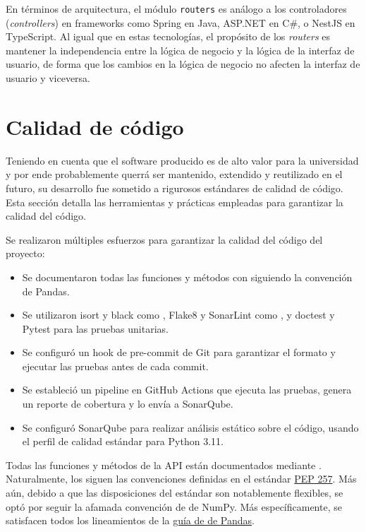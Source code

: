 En términos de arquitectura, el módulo \texttt{routers} es análogo a los controladores (\textit{controllers}) en frameworks como Spring en Java, ASP.NET en C\#, o NestJS en TypeScript. Al igual que en estas tecnologías, el propósito de los \textit{routers} es mantener la independencia entre la lógica de negocio y la lógica de la interfaz de usuario, de forma que los cambios en la lógica de negocio no afecten la interfaz de usuario y viceversa.

\section{Calidad de código}
\label{sec:calidad_codigo}

Teniendo en cuenta que el software producido es de alto valor para la universidad y por ende probablemente querrá ser mantenido, extendido y reutilizado en el futuro, su desarrollo fue sometido a rigurosos estándares de calidad de código. Esta sección detalla las herramientas y prácticas empleadas para garantizar la calidad del código.

\begin{resumen}
	Se realizaron múltiples esfuerzos para garantizar la calidad del código del proyecto:
	\begin{itemize}
		\item Se documentaron todas las funciones y métodos con  siguiendo la convención de \gls{Pandas}.
		\item Se utilizaron \gls{isort} y \gls{black} como , \gls{Flake8} y \gls{SonarLint} como , y \gls{doctest} y \gls{Pytest} para las \gls{pruebas unitarias}.
		\item Se configuró un \gls{hook} de pre-commit de \gls{Git} para garantizar el formato y ejecutar las pruebas antes de cada commit.
		\item Se estableció un \gls{pipeline} en \gls{GitHub Actions} que ejecuta las pruebas, genera un reporte de cobertura y lo envía a \gls{SonarQube}.
		\item Se configuró \gls{SonarQube} para realizar análisis estático sobre el código, usando el \gls{perfil de calidad} estándar para \gls{Python} 3.11.
	\end{itemize}
\end{resumen}


Todas las funciones y métodos de la \gls{API} están documentados mediante . Naturalmente, los  siguen las convenciones definidas en el estándar \href{https://peps.python.org/pep-0257/}{\gls{PEP} 257}. Más aún, debido a que las disposiciones del estándar son notablemente flexibles, se optó por seguir la afamada convención de  de \gls{NumPy}. Más específicamente, se satisfacen todos los lineamientos de la \href{https://python-sprints.github.io/pandas/guide/pandas_docstring.html}{guía de  de \gls{Pandas}}.

